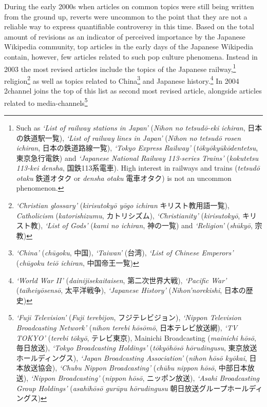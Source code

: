 \documentclass[10pt,british,A4paper,oneside]{memoir}
\begin{document}
During the early 2000s when articles on common topics were still being
written from the ground up, reverts were uncommon to the point that they
are not a reliable way to express quantifiable controversy in this time.
Based on the total amount of revisions as an indicator of perceived
importance by the Japanese Wikipedia community, top articles in the
early days of the Japanese Wikipedia contain, however, few articles
related to such pop culture phenomena. Instead in 2003 the most revised
articles include the topics of the Japanese railway,\footnote{Such as
  \emph{`List of railway stations in Japan'} (\emph{Nihon no tetsudō-eki
  ichiran}, 日本の鉄道駅一覧), \emph{`List of railway lines in Japan'}
  (\emph{Nihon no tetsudō rosen ichiran}, 日本の鉄道路線一覧),
  \emph{`Tokyo Express Railway'} (\emph{tōkyōkyūkōdentetsu},
  東京急行電鉄) and \emph{`Japanese National Railway 113-series Trains'}
  (\emph{kokutetsu 113-kei densha}, 国鉄113系電車). High interest in
  railways and trains (\emph{tetsudō otaku} 鉄道オタク or \emph{densha
  otaku} 電車オタク) is not an uncommon phenomenon.} religion\footnote{\emph{`Christian
  glossary'} (\emph{kirisutokyō yōgo ichiran} キリスト教用語一覧),
  \emph{Catholicism} (\emph{katorishizumu}, カトリシズム),
  \emph{`Christianity'} (\emph{kirisutokyō}, キリスト教), \emph{`List of
  Gods'} (\emph{kami no ichiran}, 神の一覧) and \emph{`Religion'}
  (\emph{shūkyō}, 宗教)} as well as topics related to China\footnote{\emph{`China'}
  (\emph{chūgoku}, 中国), \emph{`Taiwan'} (台湾), \emph{`List of Chinese
  Emperors' } (\emph{chūgoku teiō ichiran}, 中国帝王一覧)} and Japanese
history.\footnote{\emph{`World War II'} (\emph{dainijisekaitaisen},
  第二次世界大戦), \emph{`Pacific War'} (\emph{taiheiyōsensō},
  太平洋戦争), \emph{`Japanese History'} (\emph{Nihon'norekishi},
  日本の歴史)} In 2004 2channel joins the top of this list as second
most revised article, alongside articles related to
media-channels\footnote{\emph{`Fuji Television'} (\emph{Fuji terebijon},
  フジテレビジョン), \emph{`Nippon Television Broadcasting Network'}
  (\emph{nihon terebi hōsōmō}, 日本テレビ放送網), \emph{`TV TOKYO'}
  (\emph{terebi tōkyō}, テレビ東京), Mainichi Broadcasting
  (\emph{mainichi hōsō}, 毎日放送), \emph{`Tokyo Broadcasting Holdings'}
  (\emph{tōkyōhōsō hōrudingusu}, 東京放送ホールディングス), \emph{`Japan
  Broadcasting Association'} (\emph{nihon hōsō kyōkai}, 日本放送協会),
  \emph{`Chubu Nippon Broadcasting'} (\emph{chūbu nippon hōsō},
  中部日本放送), \emph{`Nippon Broadcasting'} (\emph{nippon hōsō},
  ニッポン放送), \emph{`Asahi Broadcasting Group Holdings'}
  (\emph{asahihōsō gurūpu hōrudingusu} 朝日放送グループホールディングス)}
\end{document}
